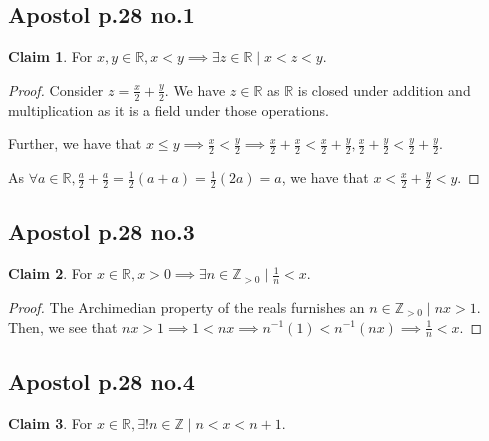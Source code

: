 \documentclass[12pt,letterpaper]{article}
\theoremstyle{definition}
\newtheorem*{claim}{Claim}
\newcommand{\R}{\mathbb{R}}
\newcommand{\Z}{\mathbb{Z}}
\newcommand{\Zg}{\mathbb{Z}_{>0}}
\begin{document}
\subsection*{Apostol p.28 no.1}

\begin{claim}
  For $x,y \in \R, x < y \implies \exists z \in \R \mid x < z < y$.
\end{claim}

\begin{proof}
  Consider $z = \frac{x}{2} + \frac{y}{2}$. We have $z \in \R$ as $\R$ is closed under
  addition and multiplication as it is a field under those operations.

  Further, we have that $x \leq y \implies \frac{x}{2} < \frac{y}{2} \implies
  \frac{x}{2} + \frac{x}{2} < \frac{x}{2} + \frac{y}{2}, \frac{x}{2} +
  \frac{y}{2} < \frac{y}{2} + \frac{y}{2}$.

  As $\forall a \in \R, \frac{a}{2} + \frac{a}{2} = \frac{1}{2}(a+a) =
  \frac{1}{2}(2a) = a$, we have that $x < \frac{x}{2} + \frac{y}{2} < y$.
\end{proof}

\subsection*{Apostol p.28 no.3}

\begin{claim}
  For $x \in \R, x>0 \implies \exists n \in \Zg \mid \frac{1}{n} < x$.
\end{claim}

\begin{proof}
  The Archimedian property of the reals furnishes an $n \in \Zg \mid nx > 1$.
  Then, we see that $nx > 1 \implies 1 < nx \implies n^{-1}(1) < n^{-1}(nx)
  \implies \frac{1}{n} < x$. 
\end{proof}

\subsection*{Apostol p.28 no.4}

\begin{claim}
  For $x \in \R, \exists ! n \in \Z \mid n < x < n+1$.
\end{claim}
\end{document}
